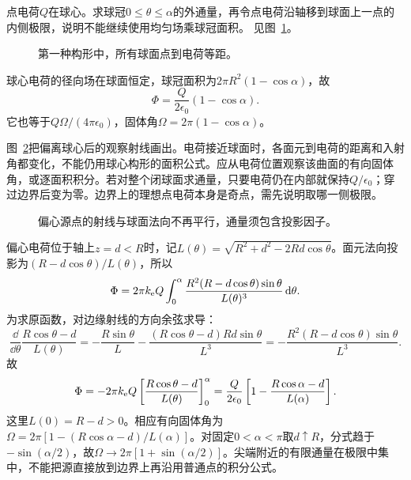 \begin{exercise}[半球面的固体角]\label{ex:es1-h3}
点电荷$Q$在球心。求球冠$0\le\theta\le\alpha$的外通量，再令点电荷沿轴移到球面上一点的内侧极限，说明不能继续使用均匀场乘球冠面积。 见图~\ref{fig:es1-h3-q}。
\end{exercise}

\begin{figure}[H]\centering
{}
\caption{第一种构形中，所有球面点到电荷等距。}\label{fig:es1-h3-q}
\end{figure}
\begin{solution}
球心电荷的径向场在球面恒定，球冠面积为$2\pi R^2(1-\cos\alpha)$，故
\[\Phi=\frac{Q}{2\epsilon_0}(1-\cos\alpha).\]
它也等于$Q\Omega/(4\pi\epsilon_0)$，固体角$\Omega=2\pi(1-\cos\alpha)$。

图~\ref{fig:es1-h3-s}把偏离球心后的观察射线画出。电荷接近球面时，各面元到电荷的距离和入射角都变化，不能仍用球心构形的面积公式。应从电荷位置观察该曲面的有向固体角，或逐面积积分。若对整个闭球面求通量，只要电荷仍在内部就保持$Q/\epsilon_0$；穿过边界后变为零。边界上的理想点电荷本身是奇点，需先说明取哪一侧极限。
\begin{figure}[H]\centering
{}
\caption{偏心源点的射线与球面法向不再平行，通量须包含投影因子。}\label{fig:es1-h3-s}
\end{figure}


偏心电荷位于轴上$z=d<R$时，记$L(\theta)=\sqrt{R^2+d^2-2Rd\cos\theta}$。面元法向投影为$(R-d\cos\theta)/L(\theta)$，所以
\[\Phi=2\pi k_{\rm e} Q\int_0^\alpha\frac{R^2(R-d\cos\theta)\sin\theta}{L(\theta)^3}\mathop{}\!\mathrm d\theta.\]
为求原函数，对边缘射线的方向余弦求导：
\[\frac{\dd}{\dd\theta}\frac{R\cos\theta-d}{L(\theta)}
=-\frac{R\sin\theta}{L}-\frac{(R\cos\theta-d)Rd\sin\theta}{L^3}
=-\frac{R^2(R-d\cos\theta)\sin\theta}{L^3}.\]
故
\[\Phi=-2\pi k_{\rm e} Q\left[\frac{R\cos\theta-d}{L(\theta)}\right]_0^\alpha
=\frac{Q}{2\epsilon_0}\left[1-\frac{R\cos\alpha-d}{L(\alpha)}\right].\]
这里$L(0)=R-d>0$。相应有向固体角为$\Omega=2\pi[1-(R\cos\alpha-d)/L(\alpha)]$。对固定$0<\alpha<\pi$取$d\uparrow R$，分式趋于$-\sin(\alpha/2)$，故$\Omega\to2\pi[1+\sin(\alpha/2)]$。尖端附近的有限通量在极限中集中，不能把源直接放到边界上再沿用普通点的积分公式。
\end{solution}

